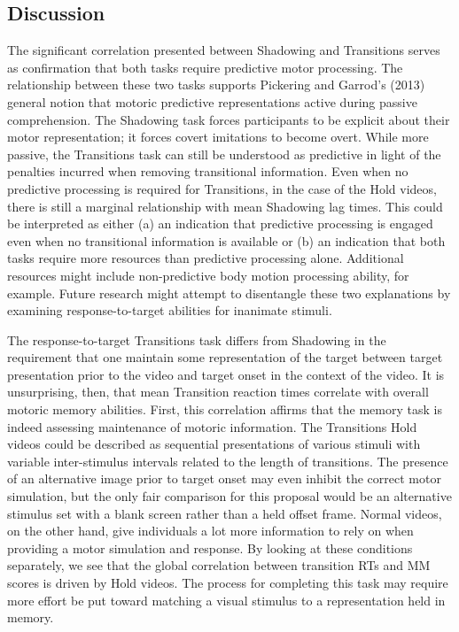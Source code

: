  

\subsection{Discussion}
            The significant correlation presented between Shadowing and Transitions serves as confirmation that both tasks require predictive motor processing. The relationship between these two tasks supports Pickering and Garrod’s (2013) general notion that motoric predictive representations active during passive comprehension. The Shadowing task forces participants to be explicit about their motor representation; it forces covert imitations to become overt. While more passive, the Transitions task can still be understood as predictive in light of the penalties incurred when removing transitional information. Even when no predictive processing is required for Transitions, in the case of the Hold videos, there is still a marginal relationship with mean Shadowing lag times. This could be interpreted as either (a) an indication that predictive processing is engaged even when no transitional information is available or (b) an indication that both tasks require more resources than predictive processing alone. Additional resources might include non-predictive body motion processing ability, for example. Future research might attempt to disentangle these two explanations by examining response-to-target abilities for inanimate stimuli. \par
            The response-to-target Transitions task differs from Shadowing in the requirement that one maintain some representation of the target between target presentation prior to the video and target onset in the context of the video. It is unsurprising, then, that mean Transition reaction times correlate with overall motoric memory abilities. First, this correlation affirms that the memory task is indeed assessing maintenance of motoric information. The Transitions Hold videos could be described as sequential presentations of various stimuli with variable inter-stimulus intervals related to the length of transitions. The presence of an alternative image prior to target onset may even inhibit the correct motor simulation, but the only fair comparison for this proposal would be an alternative stimulus set with a blank screen rather than a held offset frame. Normal videos, on the other hand, give individuals a lot more information to rely on when providing a motor simulation and response. By looking at these conditions separately, we see that the global correlation between transition RTs and MM scores is driven by Hold videos. The process for completing this task may require more effort be put toward matching a visual stimulus to a representation held in memory. \par
